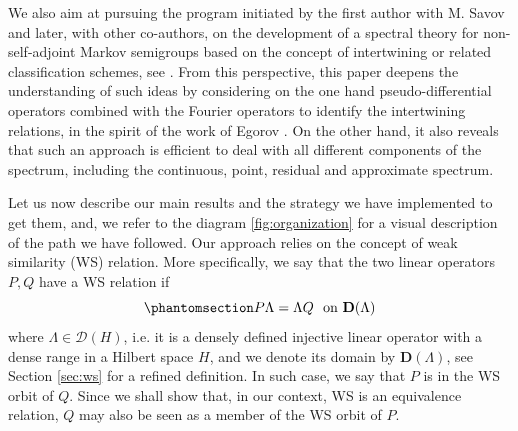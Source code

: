 \documentclass[12pt]{amsart}
\newcommand{\hlabel}{\phantomsection\label}
\numberwithin{equation}{section}
\newcommand{\D}{\mathbf{D}}
\theoremstyle{definition}
\theoremstyle{assump}
\theoremstyle{remark}
\begin{document}
We also aim at pursuing  the program initiated by the first author with M. Savov \cite{patiesavov1,patiesavov} and later, with other co-authors,  on the development of a spectral theory for non-self-adjoint Markov semigroups based on the concept of intertwining or related classification schemes, see  \cite{Choi-Patie, CP, CherPat, Patie-Miclo, MPS, PZS}.   From this perspective, this paper deepens the understanding of such ideas by considering on the one hand pseudo-differential operators combined with the Fourier operators to identify the intertwining relations, in the spirit of the work of Egorov \cite{Ego}. On the other hand, it also reveals that such an approach is efficient to deal with all different components of the spectrum, including the continuous, point, residual and approximate spectrum.

Let us now  describe  our main results and the strategy we have implemented to get them, and, we refer to the diagram \ref{fig:organization} for a visual description of the path we have followed. Our approach relies on the concept of weak similarity (WS) relation. More specifically, we say  that the two linear operators $P, Q$ have a  WS relation if
\begin{equation}\hlabel{eq:wso}
  P\Lambda =\Lambda Q\ \mbox{ on } \D(\Lambda )
\end{equation}
where   $\Lambda \in \mathscr{D}(H)$, i.e. it is a densely defined injective linear operator  with a dense range in a Hilbert space $H$, and we denote its domain by $\D(\Lambda )$,  see Section \ref{sec:ws} for a refined definition. In such case, we say that $P$ is in the WS orbit of $Q$. Since we shall show that, in our context, WS is an equivalence relation,  $Q$ may also be seen as a member of the WS orbit of $P$.
\end{document}
